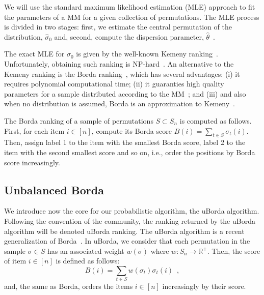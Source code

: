 \documentclass[runningheads]{llncs}
\begin{document}
We will use the standard maximum likelihood estimation (MLE) approach to fit the parameters of a MM for a given collection of permutations. 
The MLE process is divided in two stages: first, we estimate the central permutation of the distribution, $\hat{\sigma}_0$ and, second, compute the dispersion parameter, $\hat\theta$~\cite{IruCalLoz2016permallows}. 

The exact MLE for $\sigma_0$ is given by the well-known Kemeny ranking~\cite{DwoKumNao2001rank}. Unfortunately,  obtaining such ranking is NP-hard~\cite{DwoKumNao2001rank}. An alternative to the Kemeny ranking is the Borda ranking~\cite{AliMei2011kemeny}, which has several advantages: (i) it requires polynomial computational time; (ii) it  guaranties  high quality parameters for a sample distributed according to the MM~\cite{CarProSha2013votes}; and (iii) and also when no distribution is assumed, Borda is an approximation to Kemeny~\cite{CopFleRur2010ordering}.

The Borda ranking of a sample of permutations $S \subset S_n$ is computed as follows. 
First, for each item $i \in [n]$, compute its Borda score $B(i) =  \sum_{t\in S}  \sigma_t(i)$. Then, assign label 1 to the item with the smallest Borda score, label 2 to the item with the second smallest score and so on, i.e., order the positions by Borda score increasingly.

\subsection{Unbalanced Borda}\label{sec:uborda}
We introduce now the core for our probabilistic algorithm, the uBorda algorithm. Following the convention of the community, the ranking returned by the uBorda algorithm will be denoted uBorda ranking. The uBorda algorithm is a recent generalization of Borda~\cite{???}. In uBorda, we consider that each permutation in the sample $\sigma\in S$ has an associated weight $w(\sigma)$ where $w\colon S_n \to \mathbb{R^{+}}$. Then, the score of item $i \in [n]$ is defined as follows:
%
\begin{equation}\label{eq:uborda_score}
B(i) =  \sum_{t\in S}  w(\sigma_t) \sigma_t(i) \enspace,
\end{equation}
%
and, the same as Borda, orders the items $i \in [n]$ increasingly by their score.
\end{document}
